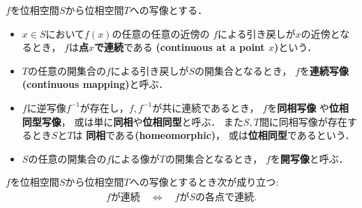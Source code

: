 	\begin{screen}
		\begin{dfn}[連続・同相・開写像]
			$f$を位相空間$S$から位相空間$T$への写像とする．
			\begin{itemize}
				\item
					$x \in S$において$f(x)$の任意の任意の近傍の
					$f$による引き戻しが$x$の近傍となるとき，
					$f$は{\bf 点$x$で連続}である
					{\bf (continuous at a point $x$)}という．
					
				\item $T$の任意の開集合の$f$による引き戻しが$S$の開集合となるとき，
					$f$を{\bf 連続写像}
					{\bf (continuous mapping)}と呼ぶ．
					
				\item $f$に逆写像$f^{-1}$が存在し，$f,f^{-1}$が共に連続であるとき，
					$f$を{\bf 同相写像}
					や{\bf 位相同型写像}，
					或は単に{\bf 同相}や{\bf 位相同型}と呼ぶ．
					また$S,T$間に同相写像が存在するとき$S$と$T$は
					{\bf 同相}である{\bf (homeomorphic)}，
					或は{\bf 位相同型}であるという．
					
				\item $S$の任意の開集合の$f$による像が$T$の開集合となるとき，
					$f$を{\bf 開写像}と呼ぶ．
			\end{itemize}
		\end{dfn}
	\end{screen}
	
	\begin{screen}
		\begin{thm}[コンパクト集合の連続写像による像はコンパクト]
		\end{thm}
	\end{screen}
	
	\begin{screen}
		\begin{thm}
		\label{thm:continuous_on_every_point_iff_continuous}
			$f$を位相空間$S$から位相空間$T$への写像とするとき次が成り立つ:
			\begin{align}
				\mbox{$f$が連続} \quad \Longleftrightarrow \quad
				\mbox{$f$が$S$の各点で連続}.
			\end{align}
		\end{thm}
	\end{screen}
	
